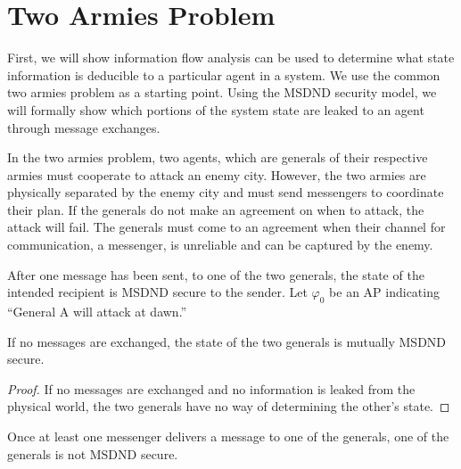 \section{Two Armies Problem}

First, we will show information flow analysis can be used to determine what state information is deducible to a particular agent in a system.
We use the common two armies problem as a starting point.
Using the MSDND security model, we will formally show which portions of the system state are leaked to an agent through message exchanges.

In the two armies problem, two agents, which are generals of their respective armies must cooperate to attack an enemy city.
However, the two armies are physically separated by the enemy city and must send messengers to coordinate their plan.
If the generals do not make an agreement on when to attack, the attack will fail.
The generals must come to an agreement when their channel for communication, a messenger, is unreliable and can be captured by the enemy.

After one message has been sent, to one of the two generals, the state of the intended recipient is MSDND secure to the sender.
Let $\varphi_0$ be an \ac{AP} indicating ``General A will attack at dawn.''

\begin{thm}
If no messages are exchanged, the state of the two generals is mutually MSDND secure. \label{thm:nomsg}
\end{thm}

\begin{proof}
If no messages are exchanged and no information is leaked from the physical world, the two generals have no way of determining the other's state.
\end{proof}

\begin{thm}
Once at least one messenger delivers a message to one of the generals, one of the generals is not MSDND secure.
\end{thm}


